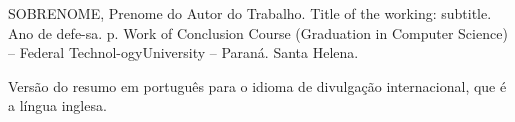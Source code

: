 SOBRENOME, Prenome do Autor do Trabalho. Title of the working: subtitle. Ano de defe-sa. \pageref{LastPage}p. Work of Conclusion Course (Graduation in Computer Science) – Federal Technol-ogyUniversity – Paraná. Santa Helena.

Versão do resumo em português para o idioma de divulgação internacional, que é a língua inglesa. 

